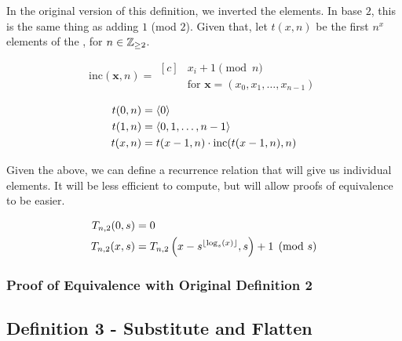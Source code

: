 \documentclass[conference]{IEEEtran}
\begin{document}
In the original version of this definition, we inverted the elements. In base $2$, this is the same thing as adding $1$ (mod $2$). Given that, let $t(x, n)$ be the first $n^x$ elements of the \ETMS, for $n \in \mathbb{Z}_{\ge 2}$.

\begin{equation}
    \text{inc}(\mathbf{x}, n) = \begin{aligned}[c]
            &x_i + 1 \pmod{n} \\
            &\text{for } \mathbf{x} = (x_0, x_1, \ldots, x_{n-1})
    \end{aligned}
\end{equation}

\begin{equation}
    \begin{aligned}
t(0, n) &= \langle 0 \rangle \\
t(1, n) &= \langle 0, 1, \ldots, n - 1 \rangle \\
t(x, n) &= t(x - 1, n) \cdot \text{inc}(t(x - 1, n), n)
    \end{aligned}
\end{equation}

Given the above, we can define a recurrence relation that will give us individual elements. It will be less efficient to compute, but will allow proofs of equivalence to be easier.

\begin{equation}
    \label{eq:pnd02}
    \begin{aligned}
T_{n,2}(0, s) &= 0 \\
T_{n,2}(x, s) &= T_{n,2}\left(x - s^{\floor{\log_s(x)}}, s\right) + 1 \pmod{s}
    \end{aligned}
\end{equation}

\subsubsection{Proof of Equivalence with Original Definition 2}

\subsection{Definition 3 - Substitute and Flatten}

\end{document}
